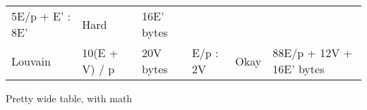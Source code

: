 \documentclass[10pt,oneside]{memoir}
\begin{document}
\begin{longtable}[]{@{}llllll@{}}
\begin{minipage}[t]{0.14\columnwidth}
5E/p + E' : 8E'\strut
\end{minipage} & \begin{minipage}[t]{0.05\columnwidth}\raggedright
Hard\strut
\end{minipage} & \begin{minipage}[t]{0.21\columnwidth}\raggedright
16E' bytes\strut
\end{minipage}\tabularnewline
\begin{minipage}[t]{0.20\columnwidth}\raggedright
Louvain\strut
\end{minipage} & \begin{minipage}[t]{0.15\columnwidth}\raggedright
10(E + V) / p\strut
\end{minipage} & \begin{minipage}[t]{0.09\columnwidth}\raggedright
20V bytes\strut
\end{minipage} & \begin{minipage}[t]{0.14\columnwidth}\raggedright
E/p : 2V\strut
\end{minipage} & \begin{minipage}[t]{0.05\columnwidth}\raggedright
Okay\strut
\end{minipage} & \begin{minipage}[t]{0.21\columnwidth}\raggedright
88E/p + 12V + 16E' bytes\strut
\end{minipage}\tabularnewline
\bottomrule
\end{longtable}

Pretty wide table, with math
\end{document}
